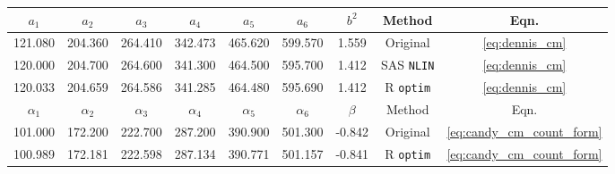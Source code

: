 
\begin{tabular}{ccccccccc}
\toprule
$a_1$ & $a_2$ & $a_3$ & $a_4$ & $a_5$ & $a_6$ & $b^2$ & Method & Eqn.\\
\midrule
121.080 & 204.360 & 264.410 & 342.473 & 465.620 & 599.570 & 1.559 & Original \citep{kemp1986stochastic} & \ref{eq:dennis_cm}\\
120.000 & 204.700 & 264.600 & 341.300 & 464.500 & 595.700 & 1.412 & SAS \verb+NLIN+ & \ref{eq:dennis_cm}\\
120.033 & 204.659 & 264.586 & 341.285 & 464.480 & 595.690 & 1.412 & R \verb+optim+ & \ref{eq:dennis_cm}\\
\midrule $\alpha_1$ & $\alpha_2$ & $\alpha_3$ & $\alpha_4$ & $\alpha_5$ & $\alpha_6$ & $\beta$ & Method & Eqn. \\ \midrule
101.000 & 172.200 & 222.700 & 287.200 & 390.900 & 501.300 & -0.842 & Original \citep{candy1991modeling} & \ref{eq:candy_cm_count_form}\\
100.989 & 172.181 & 222.598 & 287.134 & 390.771 & 501.157 & -0.841 & R \verb+optim+ & \ref{eq:candy_cm_count_form}\\
\bottomrule
\end{tabular}